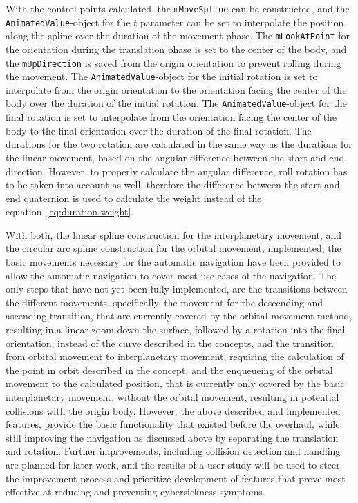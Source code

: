 With the control points calculated, the \texttt{mMoveSpline} can be constructed, and the
\texttt{AnimatedValue}-object for the $t$ parameter can be set to interpolate the position along the spline
over the duration of the movement phase.
The \texttt{mLookAtPoint} for the orientation during the translation phase is set to the center of the body,
and the \texttt{mUpDirection} is saved from the origin orientation to prevent rolling during the movement.
The \texttt{AnimatedValue}-object for the initial rotation is set to interpolate from the origin orientation
to the orientation facing the center of the body over the duration of the initial rotation.
The \texttt{AnimatedValue}-object for the final rotation is set to interpolate from the orientation facing the
center of the body to the final orientation over the duration of the final rotation.
The durations for the two rotation are calculated in the same way as the durations for the linear movement, based on
the angular difference between the start and end direction.
However, to properly calculate the angular difference, roll rotation has to be taken into account as well, therefore
the difference between the start and end quaternion is used to calculate the weight instead of the
equation~\ref{eq:duration-weight}.

With both, the linear spline construction for the interplanetary movement, and the circular arc spline construction
for the orbital movement, implemented, the basic movements necessary for the automatic navigation have been
provided to allow the automatic navigation to cover most use cases of the navigation.
The only steps that have not yet been fully implemented, are the transitions between the different movements,
specifically, the movement for the descending and ascending transition, that are currently covered by the orbital
movement method, resulting in a linear zoom down the surface, followed by a rotation into the final orientation,
instead of the curve described in the concepts, and the transition from orbital movement to interplanetary movement,
requiring the calculation of the point in orbit described in the concept, and the enqueueing of the orbital movement to
the calculated position, that is currently only covered by the basic interplanetary movement, without the orbital
movement, resulting in potential collisions with the origin body.
However, the above described and implemented features, provide the basic functionality that existed before the
overhaul, while still improving the navigation as discussed above by separating the translation and rotation.
Further improvements, including collision detection and handling are planned for later work, and the results of a
user study will be used to steer the improvement process and prioritize development of features that prove most
effective at reducing and preventing cybersickness symptoms.

